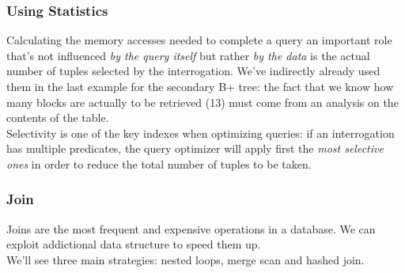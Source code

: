 \documentclass{article}
\begin{document}
			\subsubsection{Using Statistics}
				Calculating the memory accesses needed to complete a query an important role that's not influenced \textit{by the query itself} but rather \textit{by the data} is the actual number of tuples selected by the interrogation. We've indirectly already used them in the last example for the secondary B+ tree: the fact that we know how many blocks are actually to be retrieved (13) must come from an analysis on the contents of the table.\\
				Selectivity is one of the key indexes when optimizing queries: if an interrogation has multiple predicates, the query optimizer will apply first the \textit{most selective ones} in order to reduce the total number of tuples to be taken. 


			\subsubsection{Join}
				Joins are the most frequent and expensive operations in a database. We can exploit addictional data structure to speed them up.\\
				We'll see three main strategies: nested loops, merge scan and hashed join.
\end{document}
